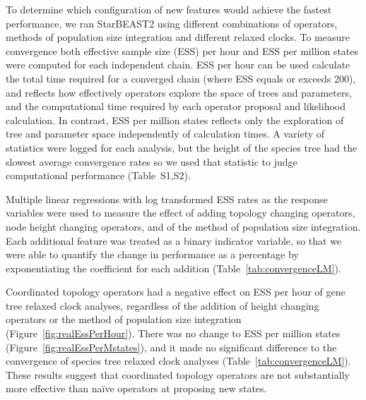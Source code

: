 \documentclass[12pt]{article}
\begin{document}
To determine which configuration of new features would achieve the fastest
performance, we ran StarBEAST2 using different combinations of operators,
methods of population size integration and different relaxed clocks. To measure
convergence both effective sample size (ESS) per hour and ESS per million states
were computed for each independent chain. ESS per hour can be used calculate the
total time required for a converged chain (where ESS equals or exceeds 200), and
reflects how effectively operators explore the space of trees and parameters,
and the computational time required by each operator proposal and likelihood
calculation. In contrast, ESS per million states reflects only the exploration
of tree and parameter space independently of calculation times. A variety of
statistics were logged for each analysis, but the height of the species tree had
the slowest average convergence rates so we used that statistic to judge
computational performance (Table~S1,S2).

Multiple linear regressions with log transformed ESS rates as the response
variables were used to measure the effect of adding topology changing operators,
node height changing operators, and of the method of population size
integration. Each additional feature was treated as a binary indicator variable, so that
we were able to quantify the change in performance as a percentage by
exponentiating the coefficient for each addition
(Table~\ref{tab:convergenceLM}).

Coordinated topology operators had a negative effect on ESS per hour of gene
tree relaxed clock analyses, regardless of the addition of height changing
operators or the method of population size integration
(Figure~\ref{fig:realEssPerHour}). There was no change to ESS per million states
(Figure~\ref{fig:realEssPerMstates}), and it made no significant difference to the
convergence of species tree relaxed clock analyses
(Table~\ref{tab:convergenceLM}). These results suggest that coordinated topology
operators are not substantially more effective than na\"ive operators at
proposing new states.
\end{document}
